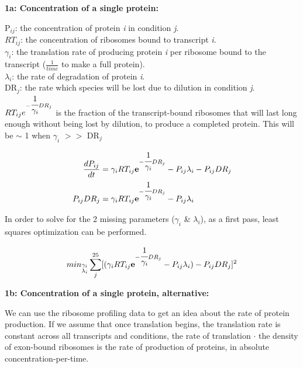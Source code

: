 \documentclass[12pt]{article}
\begin{document}
\textbf{1a: Concentration of a single protein:}

P$_{ij}$: the concentration of protein \textit{i} in condition \textit{j}.\\
$RT_{ij}$: the concentration of ribosomes bound to transcript \textit{i}.\\  
$\gamma_{i}$: the translation rate of producing protein \textit{i} per ribosome bound to the transcript ($\frac{1}{time}$ to make a full protein).\\
$\lambda_{i}$: the rate of degradation of protein \textit{i}.\\
DR$_{j}$: the rate which species will be lost due to dilution in condition \textit{j}.\\

$RT_{ij}e^{-\cfrac{1}{\gamma_{i}}DR_{j}}$ is the fraction of the transcript-bound ribosomes that will last long enough without being lost by dilution, to produce a completed protein.  This will be $\sim$ 1 when $\gamma_{i}$ $>>$ DR$_{j}$

\begin{align}
\frac{dP_{ij}}{dt} &= \gamma_{i}RT_{ij}\textbf{e}^{-\cfrac{1}{\gamma_{i}}DR_{j}} - P_{ij}\lambda_{i} - P_{ij}DR_{j}\notag\\
P_{ij}DR_{j} &= \gamma_{i}RT_{ij}\textbf{e}^{-\cfrac{1}{\gamma_{i}}DR_{j}} - P_{ij}\lambda_{i}\label{prot}
\end{align}

In order to solve for the 2 missing parameters ($\gamma_{i}$ \& $\lambda_{i}$), as a first pass, least squares optimization can be performed.

\begin{equation}
min_{\substack{
   \gamma_{i} \\
   \lambda_{i}
  }}\sum_{j}^{25}[(\gamma_{i}RT_{ij}\textbf{e}^{-\cfrac{1}{\gamma_{i}}DR_{j}} - P_{ij}\lambda_{i}) - P_{ij}DR_{j}]^{2}
\end{equation}

\vspace{2cm}

\textbf{1b: Concentration of a single protein, alternative:}

We can use the ribosome profiling data to get an idea about the rate of protein production.  If we assume that once translation begins, the translation rate is constant across all transcripts and conditions, the rate of translation $\cdot$ the density of exon-bound ribosomes is the rate of production of proteins, in absolute concentration-per-time.
\end{document}
